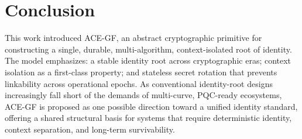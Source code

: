 \documentclass[11pt,a4paper]{article}
\begin{document}
\section{Conclusion}
This work introduced ACE-GF, an abstract cryptographic primitive for constructing a single, durable, multi-algorithm, context-isolated root of identity. The model emphasizes: a stable identity root across cryptographic eras; context isolation as a first-class property; and stateless secret rotation that prevents linkability across operational epochs. As conventional identity-root designs increasingly fall short of the demands of multi-curve, PQC-ready ecosystems, ACE-GF is proposed as one possible direction toward a unified identity standard, offering a shared structural basis for systems that require deterministic identity, context separation, and long-term survivability.


\end{document}
